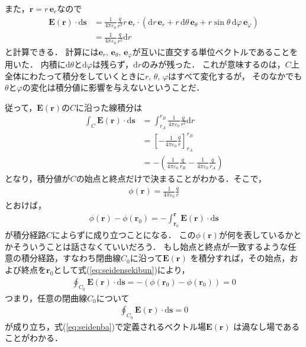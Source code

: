 また，$\bm{r} = r \, \bm{e}_r$なので
\begin{align*}
\bm{E}(\bm{r}) \cdot \mathrm{d} \bm{s} 
& = \frac{1}{4 \pi \varepsilon_0} \frac{q}{r^3} r \, \bm{e}_r \cdot 
(\mathrm{d} r \, \bm{e}_r 
+ r \, \mathrm{d}\theta \, \bm{e}_\theta
+ r \sin \theta \, \mathrm{d} \varphi \, \bm{e}_\varphi) \\
& = \frac{1}{4 \pi \varepsilon_0} \frac{q}{r^2} \mathrm{d}r
\end{align*}
と計算できる．
計算には$\bm{e}_r, \, \bm{e}_\theta, \, \bm{e}_\varphi$が互いに直交する単位ベクトルであることを用いた．
内積に$\mathrm{d}\theta$と$\mathrm{d}\varphi$は残らず，$\mathrm{d}r$のみが残った．
これが意味するのは，$C$上全体にわたって積分をしていくときに$r, \, \theta, \, \varphi$はすべて変化するが，
そのなかでも$\theta$と$\varphi$の変化は積分値に影響を与えないということだ．

従って，$\bm{E}(\bm{r})$の$C$に沿った線積分は
\begin{align*}
\int_{C} \bm{E}(\bm{r}) \cdot \mathrm{d} \bm{s}
& = \int_{r_A}^{r_B}  \frac{1}{4 \pi \varepsilon_0} \frac{q}{r^2}  \mathrm{d}r \\
& = \left[ - \frac{1}{4 \pi \varepsilon_0} \frac{q}{r} \right]_{r_A}^{r_B} \\
& = - \left( \frac{1}{4 \pi \varepsilon_0} \frac{q}{r_B} 
- \frac{1}{4 \pi \varepsilon_0} \frac{q}{r_A} \right)
\end{align*}
となり，積分値が$C$の始点と終点だけで決まることがわかる．そこで，
\begin{align}
\phi (\bm{r} ) = \frac{1}{4 \pi \varepsilon_0} \frac{q}{r}
\label{eq:seidenpotential}
\end{align}
とおけば，
\begin{align}
\phi(\bm{r}) - \phi ( \bm{r}_0) = - \int_{\bm{r}_0}^{\bm{r}} \bm{E}(\bm{r}) \cdot \mathrm{d}\bm{s}
\label{eq:seidensekibun} 
\end{align}
が積分経路$C$によらずに成り立つことになる．
この$\phi(\bm{r})$が何を表しているかとかそういうことは話さなくていいだろう．
もし始点と終点が一致するような任意の積分経路，すなわち閉曲線$C_0$に沿って$\bm{E}(\bm{r})$
を積分すれば，その始点，および終点を$\bm{r}_0$として式(\ref{eq:seidensekibun})により，
\begin{align*}
\oint_{C_0} \bm{E}(\bm{r}) \cdot \mathrm{d} \bm{s} 
= - ( \phi (\bm{r}_0) - \phi ( \bm{r}_0) ) = 0
\end{align*}
つまり，任意の閉曲線$C_0$について
\begin{align}
\oint_{C_0} \bm{E}(\bm{r}) \cdot \mathrm{d} \bm{s} = 0
\label{eq:seidenbauzunasi}
\end{align}
が成り立ち，式(\ref{eq:seidenba})で定義されるベクトル場$\bm{E}(\bm{r})$
は渦なし場であることがわかる．


